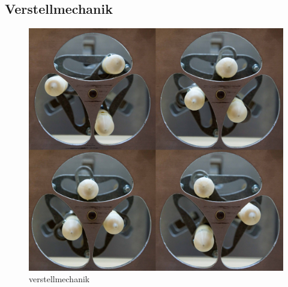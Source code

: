 \subsection{Verstellmechanik}

\begin{figure}[H]
	\includegraphics[width=1\textwidth]{Illustrationen/7-Inbetriebnahme_und_Kalibration/verstellmechanik.jpg}
	\caption{verstellmechanik}
	\label{fig:verstellmechanik}
\end{figure}